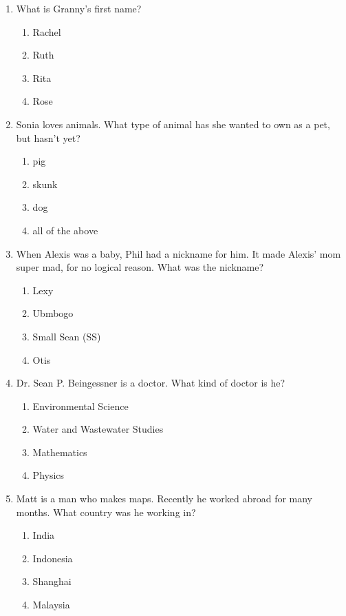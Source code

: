 \documentclass[11pt]{exam}
\begin{document}
\begin{questions}
\begin{enumerate}
\item What is Granny’s first name?

\begin{enumerate}
\item{} Rachel
\item{} Ruth
\item{} Rita
\item{} Rose
\end{enumerate}


\item Sonia loves animals. What type of animal has she wanted to own as a pet, but hasn’t yet?

\begin{enumerate}
\item{} pig
\item{} skunk
\item{} dog
\item{} all of the above
\end{enumerate}


\item When Alexis was a baby, Phil had a nickname for him. It made Alexis’ mom super mad, for no logical reason. What was the nickname?

\begin{enumerate}
\item{} Lexy
\item{} Ubmbogo
\item{} Small Sean (SS)
\item{} Otis
\end{enumerate}


\item Dr. Sean P. Beingessner is a doctor. What kind of doctor is he?

\begin{enumerate}
\item{} Environmental Science
\item{} Water and Wastewater Studies
\item{} Mathematics
\item{} Physics
\end{enumerate}


\item Matt is a man who makes maps. Recently he worked abroad for many months. What country
was he working in?

\begin{enumerate}
\item{} India
\item{} Indonesia
\item{} Shanghai
\item{} Malaysia
\end{enumerate}



\end{enumerate}
\end{questions}
\end{document}
